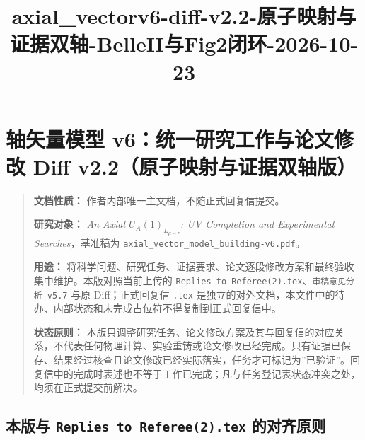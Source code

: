 \documentclass[
]{article}
\title{axial\_vectorv6-diff-v2.2-原子映射与证据双轴-BelleII与Fig2闭环-2026-10-23}
\author{}
\date{}
\begin{document}
\sloppy
\maketitle

\section{轴矢量模型 v6：统一研究工作与论文修改 Diff
v2.2（原子映射与证据双轴版）}\label{ux8f74ux77e2ux91cfux6a21ux578b-v6ux7edfux4e00ux7814ux7a76ux5de5ux4f5cux4e0eux8bbaux6587ux4feeux6539-diff-v2.2ux539fux5b50ux6620ux5c04ux4e0eux8bc1ux636eux53ccux8f74ux7248}

\begin{quote}
\textbf{文档性质：} 作者内部唯一主文档，不随正式回复信提交。

\textbf{研究对象：} \emph{An Axial \(U_A(1)_{L_{\mu-\tau}}\): UV
Completion and Experimental Searches}，基准稿为
\texttt{axial\_\hspace{0pt}vector\_\hspace{0pt}model\_\hspace{0pt}building-\hspace{0pt}v6.\hspace{0pt}pdf}。

\textbf{用途：}
将科学问题、研究任务、证据要求、论文逐段修改方案和最终验收集中维护。本版对照当前上传的
\texttt{Replies\ to\ Referee(2).\hspace{0pt}tex}、\texttt{审稿意见分析\ v5.\hspace{0pt}7} 与原
Diff；正式回复信 \texttt{.\hspace{0pt}tex}
是独立的对外文档，本文件中的待办、内部状态和未完成占位符不得复制到正式回复信中。

\textbf{状态原则：}
本版只调整研究任务、论文修改方案及其与回复信的对应关系，不代表任何物理计算、实验重铸或论文修改已经完成。只有证据已保存、结果经过核查且论文修改已经实际落实，任务才可标记为''已验证''。回复信中的完成时表述也不等于工作已完成；凡与任务登记表状态冲突之处，均须在正式提交前解决。
\end{quote}

\subsection{\texorpdfstring{本版与 \texttt{Replies\ to\ Referee(2).\hspace{0pt}tex}
的对齐原则}{本版与 Replies to Referee(2).tex 的对齐原则}}\label{ux672cux7248ux4e0e-replies-to-referee2.tex-ux7684ux5bf9ux9f50ux539fux5219}
\end{document}
